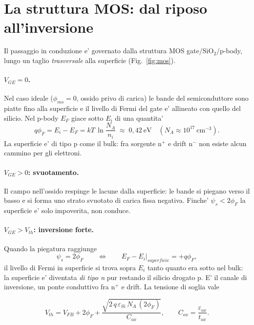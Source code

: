 \documentclass[11pt,a4paper]{article}
\begin{document}
\section{La struttura MOS: dal riposo all'inversione}

Il passaggio in conduzione e' governato dalla struttura MOS
gate/$\mathrm{SiO_2}$/p-body, lungo un taglio \emph{trasversale} alla
superficie (Fig.~\ref{fig:mos}).

\paragraph{$V_{GE}=0$.} Nel caso ideale ($\phi_{ms}=0$, ossido privo di carica)
le bande del semiconduttore sono piatte fino alla superficie e il livello di
Fermi del gate e' allineato con quello del silicio. Nel p-body $E_F$ giace
sotto $E_i$ di una quantita'
\begin{equation}
q\phi_F = E_i - E_F = kT\,\ln\!\frac{N_A}{n_i}\;\approx\;0{,}42~\mathrm{eV}
\quad (N_A \approx 10^{17}~\mathrm{cm^{-3}}).
\end{equation}
La superficie e' di tipo p come il bulk: fra sorgente $\mathrm{n^{+}}$ e drift
$\mathrm{n^{-}}$ non esiste alcun cammino per gli elettroni.

\paragraph{$V_{GE}>0$: svuotamento.} Il campo nell'ossido respinge le lacune
dalla superficie: le bande si piegano verso il basso e si forma uno strato
svuotato di carica fissa negativa. Finche' $\psi_s < 2\phi_F$ la superficie e'
solo impoverita, non conduce.

\paragraph{$V_{GE}>V_{th}$: inversione forte.} Quando la piegatura raggiunge
\begin{equation}
\psi_s = 2\phi_F
\qquad\Longleftrightarrow\qquad
E_F - E_i\big|_{superficie} = +q\phi_F ,
\end{equation}
il livello di Fermi in superficie si trova sopra $E_i$ tanto quanto era sotto
nel bulk: la superficie e' diventata \emph{di tipo n} pur restando il silicio
drogato p. E' il canale di inversione, un ponte conduttivo fra
$\mathrm{n^{+}}$ e drift. La tensione di soglia vale

\begin{equation}
V_{th} = V_{FB} + 2\phi_F + \frac{\sqrt{2\,q\,\varepsilon_{Si}\,N_A\,(2\phi_F)}}{C_{ox}},
\qquad C_{ox}=\frac{\varepsilon_{ox}}{t_{ox}} .
\end{equation}
\end{document}
